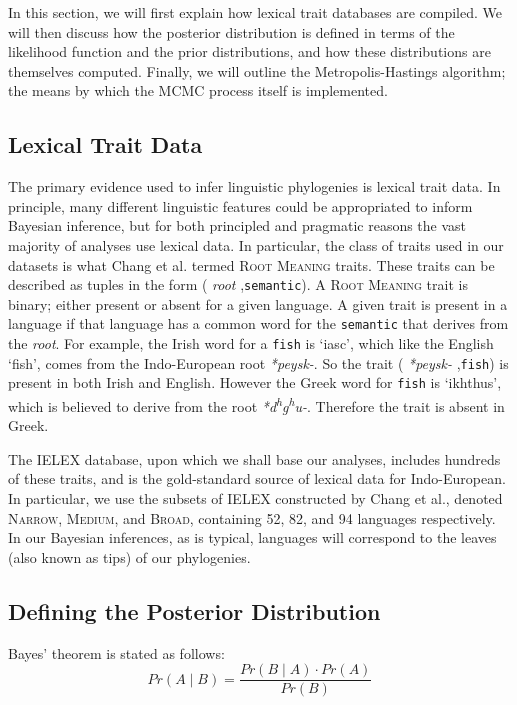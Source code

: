 \documentclass[10pt,journal,compsoc]{IEEEtran}
\newcommand{\ts}{\textsuperscript}
\begin{document}
In this section, we will first explain how lexical trait databases are compiled. We will then discuss how the posterior distribution is defined in terms of the likelihood function and the prior distributions, and how these distributions are themselves computed. Finally, we will outline the Metropolis-Hastings algorithm; the means by which the MCMC process itself is implemented.

\subsection{Lexical Trait Data}

The primary evidence used to infer linguistic phylogenies is lexical trait data. In principle, many different linguistic features could be appropriated to inform Bayesian inference, but for both principled and pragmatic reasons the vast majority of analyses use lexical data. In particular, the class of traits used in our datasets is what Chang et al. termed \textsc{Root Meaning} traits. These traits can be described as tuples in the form (\textit{ root },\;\texttt{semantic}\;). A \textsc{Root Meaning} trait is binary; either present or absent for a given language. A given trait is present in a language if that language has a common word for the \texttt{semantic} that derives from the \textit{root}. For example, the Irish word for a \texttt{fish} is `iasc', which like the English `fish', comes from the Indo-European root \textit{*peysk-}. So the trait (\textit{ *peysk- },\;\texttt{fish}\;) is present in both Irish and English. However the Greek word for \texttt{fish} is `ikhthus', which is believed to derive from the root \textit{*d\ts{h}g\ts{h}u-}. Therefore the trait is absent in Greek.

The IELEX database, upon which we shall base our analyses, includes hundreds of these traits, and is the gold-standard source of lexical data for Indo-European. In particular, we use the subsets of IELEX constructed by Chang et al., denoted \textsc{Narrow}, \textsc{Medium}, and \textsc{Broad}, containing 52, 82, and 94 languages respectively. In our Bayesian inferences, as is typical, languages will correspond to the leaves (also known as tips) of our phylogenies.

\subsection{Defining the Posterior Distribution}

Bayes' theorem is stated as follows:
\begin{equation}
    Pr(A\;|\;B) = \frac{Pr(B\;|\;A) \cdot Pr(A)}{Pr(B)}
\end{equation}
\end{document}
